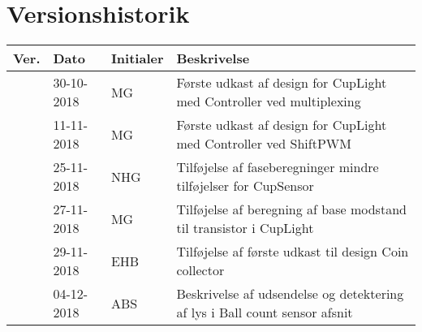 \documentclass[HardwareDesign/HardwareDesign_main.tex]{subfiles}
\begin{document}
\section{Versionshistorik}
\begin{longtable}{|L{0.07\textwidth}|L{0.15\textwidth}|L{0.13\textwidth}|L{0.55\textwidth}|}
        \hline
        \textbf{Ver.} & \textbf{Dato} & \textbf{Initialer} & \textbf{Beskrivelse}  \\ \hline
         & 30-10-2018 & MG &  Første udkast af design for CupLight med Controller ved multiplexing\\ \hline
         & 11-11-2018 & MG &  Første udkast af design for CupLight med Controller ved ShiftPWM\\ \hline
         & 25-11-2018 & NHG & Tilføjelse af faseberegninger mindre tilføjelser for CupSensor \\ \hline
         & 27-11-2018 & MG & Tilføjelse af beregning af base modstand til transistor i CupLight \\ \hline
         & 29-11-2018 & EHB & Tilføjelse af første udkast til design Coin collector  \\ \hline
         & 04-12-2018 & ABS & Beskrivelse af udsendelse og detektering af lys i Ball count sensor afsnit \\ \hline
\end{longtable}
\end{document}
